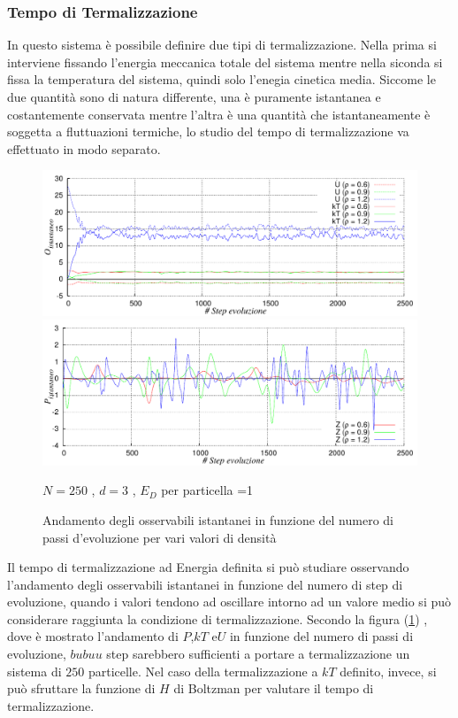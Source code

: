 \documentclass[11pt]{article}
\theoremstyle{plain}
\theoremstyle{remark}
\begin{document}
\subsubsection{Tempo di Termalizzazione}
In questo sistema è possibile definire due tipi di termalizzazione. Nella prima si interviene fissando l'energia meccanica totale del sistema mentre nella siconda si fissa la temperatura del sistema, quindi solo l'enegia cinetica media.
Siccome le due quantità sono di natura differente, una è puramente istantanea e costantemente conservata mentre l'altra è una quantità che istantaneamente è soggetta a fluttuazioni termiche, lo studio del tempo di termalizzazione va effettuato in modo separato.

	\begin{figure}
		\centering
		\caption[Sfere Soffici$/$Preliminari\_Termalizzazione.cpp]{Andamento degli osservabili istantanei in funzione del numero di passi d'evoluzione per vari valori di densità}\label{fig: Termal E D Soffici}

		\includegraphics[scale=0.5]{Immagini/Soffici/Termal_OvsStep}

		\includegraphics[scale=0.5]{Immagini/Soffici/Termal_PvsStep}

		\centering  \footnotesize{$N= 250$ , $d=3$ , $E_D$ per particella =1}
	\end{figure}
Il tempo di termalizzazione ad Energia definita si può studiare osservando l'andamento degli osservabili istantanei in funzione del numero di step di evoluzione, quando i valori tendono ad oscillare intorno ad un valore medio si può considerare raggiunta la condizione di termalizzazione. 
Secondo la figura (\ref{fig: Termal E D Soffici}) , dove è mostrato l'andamento di $P$,$kT$ e$U$ in funzione del numero di passi di evoluzione, $bubuu$ step sarebbero sufficienti a portare a termalizzazione un sistema di $250$ particelle.
\medskip\newline
Nel caso della termalizzazione a $kT$ definito, invece, si può sfruttare la funzione di $H$ di Boltzman per valutare il tempo di termalizzazione.
\end{document}
